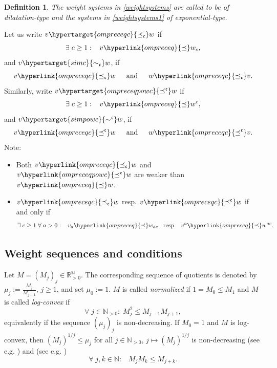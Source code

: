 \documentclass[10pt]{amsart}%
\numberwithin{equation}{section}
\theoremstyle{plain}
\newtheorem{definition}[proposition]{Definition}
\newcommand{\RR}{\mathbb{R}}
\newcommand{\NN}{\mathbb{N}}
\begin{document}
\begin{definition}
The weight systems in \eqref{weightsystems} are called to be of {\itshape dilatation-type} and the systems in \eqref{weightsystems1} of {\itshape exponential-type.}
\end{definition}

Let us write $v\hypertarget{ompreceqc}{\preceq_{\mathfrak{c}}}w$ if
\begin{equation}\label{bigOdilarelation}
\exists\;c\ge 1:\;\;\;v\hyperlink{ompreceq}{\preceq}w_c,
\end{equation}
and $v\hypertarget{simc}{\sim_{\mathfrak{c}}}w$, if
$$v\hyperlink{ompreceqc}{\preceq_{\mathfrak{c}}}w\hspace{15pt}\text{and}\hspace{15pt}w\hyperlink{ompreceqc}{\preceq_{\mathfrak{c}}}v.$$ Similarly, write $v\hypertarget{ompreceqpowc}{\preceq^{\mathfrak{c}}}w$ if
\begin{equation}\label{bigOexprelation}
\exists\;c\ge 1:\;\;\;v\hyperlink{ompreceq}{\preceq}w^c,
\end{equation}
and $v\hypertarget{simpowc}{\sim^{\mathfrak{c}}}w$, if
$$v\hyperlink{ompreceqc}{\preceq^{\mathfrak{c}}}w\hspace{15pt}\text{and}\hspace{15pt}w\hyperlink{ompreceqc}{\preceq^{\mathfrak{c}}}v.$$
Note:
\begin{itemize}
\item[$(*)$] Both $v\hyperlink{ompreceqc}{\preceq_{\mathfrak{c}}}w$ and $v\hyperlink{ompreceqpowc}{\preceq^{\mathfrak{c}}}w$ are weaker than $v\hyperlink{ompreceq}{\preceq}w$.

\item[$(*)$] $v\hyperlink{ompreceqc}{\preceq_{\mathfrak{c}}}w$ resp. $v\hyperlink{ompreceqc}{\preceq^{\mathfrak{c}}}w$ if and only if $$\exists\;c\ge 1\;\forall\;a>0:\;\;\;v_a\hyperlink{ompreceq}{\preceq}w_{ac}\;\;\;\text{resp.}\;\;\;v^a\hyperlink{ompreceq}{\preceq}w^{ac}.$$
\end{itemize}

\subsection{Weight sequences and conditions}
Let $M=(M_j)_j\in\RR_{>0}^{\NN}$. The corresponding sequence of quotients is denoted by $\mu_j:=\frac{M_j}{M_{j-1}}$, $j\ge 1$, and set $\mu_0:=1$. $M$ is called {\itshape normalized} if $1=M_0\le M_1$ and $M$ is called {\itshape log-convex} if
$$\forall\;j\in\NN_{>0}:\;M_j^2\le M_{j-1} M_{j+1},$$
equivalently if the sequence $(\mu_j)_j$ is non-decreasing. If $M_0=1$ and $M$ is log-convex, then $(M_j)^{1/j}\le\mu_j$ for all $j\in\NN_{>0}$, $j\mapsto(M_j)^{1/j}$ is non-decreasing (see e.g. \cite[Lemma 2.0.4]{diploma}) and (see e.g. \cite[Lemma 2.0.6]{diploma})
\begin{equation}\label{expsuperadd}
\forall\;j,k\in\NN:\;\;\;M_jM_k\le M_{j+k}.
\end{equation}
\end{document}

